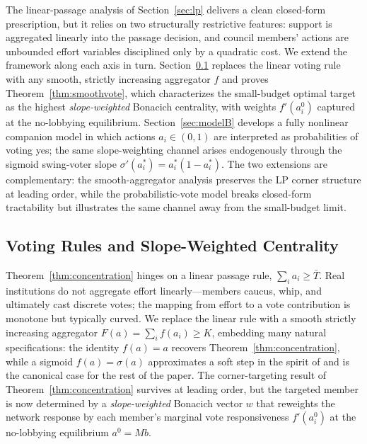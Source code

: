 \documentclass[11pt,letterpaper]{article}
\theoremstyle{plain}
\theoremstyle{definition}
\theoremstyle{remark}
\begin{document}
The linear-passage analysis of Section~\ref{sec:lp} delivers a clean closed-form prescription, but it relies on two structurally restrictive features: support is aggregated linearly into the passage decision, and council members' actions are unbounded effort variables disciplined only by a quadratic cost. We extend the framework along each axis in turn. Section~\ref{sec:theorem3} replaces the linear voting rule with any smooth, strictly increasing aggregator $f$ and proves Theorem~\ref{thm:smoothvote}, which characterizes the small-budget optimal target as the highest \emph{slope-weighted} Bonacich centrality, with weights $f'(a^0_i)$ captured at the no-lobbying equilibrium. Section~\ref{sec:modelB} develops a fully nonlinear companion model in which actions $a_i \in (0,1)$ are interpreted as probabilities of voting yes; the same slope-weighting channel arises endogenously through the sigmoid swing-voter slope $\sigma'(a_i^*) = a_i^*(1 - a_i^*)$. The two extensions are complementary: the smooth-aggregator analysis preserves the LP corner structure at leading order, while the probabilistic-vote model breaks closed-form tractability but illustrates the same channel away from the small-budget limit.

\subsection{Voting Rules and Slope-Weighted Centrality}
\label{sec:theorem3}

Theorem~\ref{thm:concentration} hinges on a linear passage rule, $\sum_i a_i \geq \bar T$. Real institutions do not aggregate effort linearly---members caucus, whip, and ultimately cast discrete votes; the mapping from effort to a vote contribution is monotone but typically curved. We replace the linear rule with a smooth strictly increasing aggregator $F(a) = \sum_i f(a_i) \geq K$, embedding many natural specifications: the identity $f(a) = a$ recovers Theorem~\ref{thm:concentration}, while a sigmoid $f(a) = \sigma(a)$ approximates a soft step in the spirit of \citet{mckelvey1995} and is the canonical case for the rest of the paper. The corner-targeting result of Theorem~\ref{thm:concentration} survives at leading order, but the targeted member is now determined by a \emph{slope-weighted} Bonacich vector $w$ that reweights the network response by each member's marginal vote responsiveness $f'(a^0_i)$ at the no-lobbying equilibrium $a^0 = Mb$.
\end{document}
